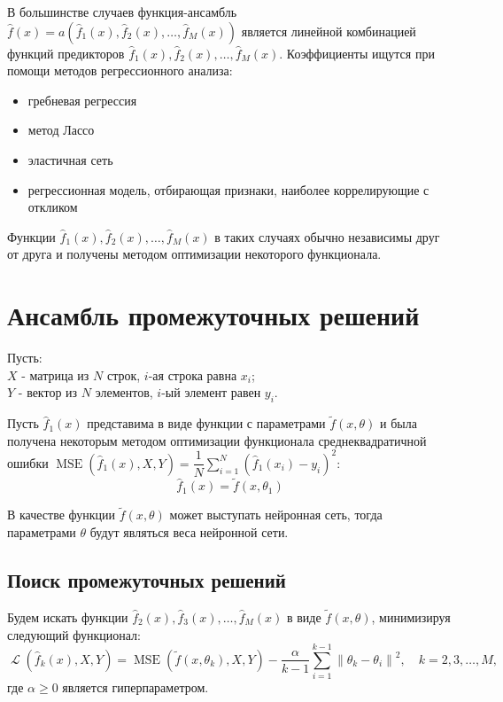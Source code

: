 \documentclass[12pt, fleqn]{article}
\newcommand{\norm}[1]{\left\lVert#1\right\rVert}
\newcommand{\loss}{\mathop{\mathcal{L}}}
\newcommand{\mse}{\mathop{MSE}}
\newcommand{\predictionfunction}{\hat{f}}
\newcommand{\ensemblefunction}{a}
\newcommand{\optimizationmethodfunction}{\tilde{f}}
\newcommand{\distinguishparameter}{\alpha}
\newcommand{\objects}{X}
\newcommand{\results}{Y}
\newcommand{\numberobjects}{N}
\newcommand{\numberpredictionfunctions}{M}
\newcommand{\for}[3]{\sum\limits_{#1 = #2}^{#3}}  %
\newcommand{\forn}[2]{\for{#1}{1}{#2}}  %
\newcommand{\many}[3]{#1 1 #2, #1 2 #2, \dots, #1 #3 #2}  %
\newcommand{\ensemblefunctionfull}{\ensemblefunction(\many{\predictionfunction_}{(x)}{\numberpredictionfunctions})}
\begin{document}
В большинстве случаев функция-ансамбль $\predictionfunction(x) = \ensemblefunctionfull$ является линейной комбинацией функций предикторов $\many{\predictionfunction_}{(x)}{\numberpredictionfunctions}$. Коэффициенты ищутся при помощи методов регрессионного анализа:
\begin{itemize}
\item гребневая регрессия~\cite{Ridge}
\item метод Лассо~\cite{Lasso}
\item эластичная сеть~\cite{ElasticNet}
\item регрессионная модель, отбирающая признаки, наиболее коррелирующие с откликом~\cite{ConvexCombinationsBestCorrelatedWithResponse}
\end{itemize}

Функции $\many{\predictionfunction_}{(x)}{\numberpredictionfunctions}$ в таких случаях обычно независимы друг от друга и получены методом оптимизации некоторого функционала.

\section{Ансамбль промежуточных решений}

Пусть:\\
$\objects$ - матрица из $\numberobjects$ строк, $i$-ая строка равна $x_i$;\\
$\results$ - вектор из $\numberobjects$ элементов, $i$-ый элемент равен $y_i$.

Пусть $\predictionfunction_1(x)$ представима в виде функции с параметрами $\optimizationmethodfunction(x, \theta)$ и была получена некоторым методом оптимизации функционала среднеквадратичной ошибки
$\mse(\predictionfunction_1(x), \objects, \results) = \dfrac{1}{\numberobjects}\forn{i}{\numberobjects} (\predictionfunction_1(x_i) - y_i)^2$:
$$\predictionfunction_1(x) = \optimizationmethodfunction(x, \theta_1)$$

В качестве функции $\optimizationmethodfunction(x, \theta)$ может выступать нейронная сеть, тогда параметрами $\theta$ будут являться веса нейронной сети.

\subsection{Поиск промежуточных решений}

Будем искать функции $\predictionfunction_2(x), \predictionfunction_3(x), \dots, \predictionfunction_\numberpredictionfunctions(x)$ в виде $\optimizationmethodfunction(x, \theta)$, минимизируя следующий функционал:
\begin{equation}\label{equation:lossfunction}
\loss(\predictionfunction_k(x), \objects, \results) = \mse(\optimizationmethodfunction(x, \theta_k), \objects, \results) -
\dfrac{\distinguishparameter}{k - 1}
\forn{i}{k - 1}\norm{\theta_k - \theta_i}^2, \quad k = 2, 3, \dots, \numberpredictionfunctions,
\end{equation}
где $\distinguishparameter \geq 0$ является гиперпараметром.
\end{document}
